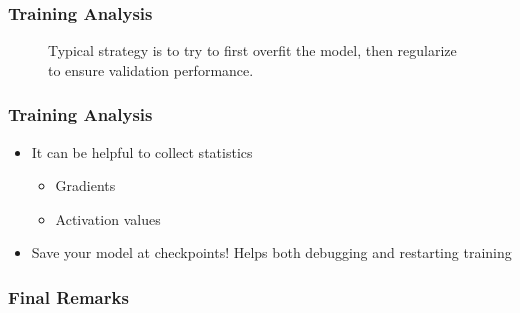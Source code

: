 \documentclass[10pt,mathserif]{beamer}
\begin{document}
\begin{frame}
  \frametitle{Training Analysis}
  \begin{figure}[ht]
    \centering
    \caption{Typical strategy is to try to first overfit the model, then
      regularize to ensure validation performance. \label{fig:learning_curves} }
  \end{figure}
\end{frame}

\begin{frame}
  \frametitle{Training Analysis}
  \begin{itemize}
  \item It can be helpful to collect statistics
    \begin{itemize}
    \item Gradients
    \item Activation values
    \end{itemize}
  \item Save your model at checkpoints! Helps both debugging and restarting
    training
  \end{itemize}
\end{frame}

\begin{frame}
  \frametitle{Final Remarks}
  
\end{frame}

\end{document}
